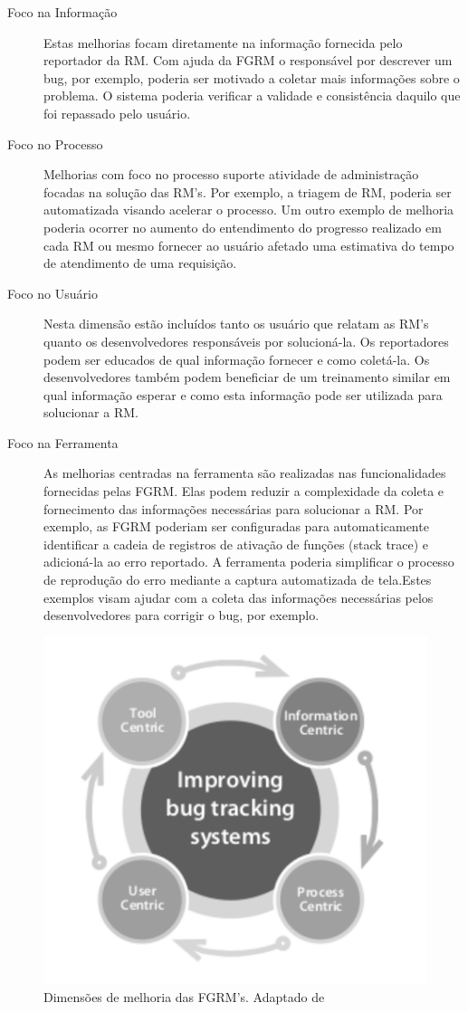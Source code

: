 \begin{description}
	\item[Foco na Informação] Estas melhorias focam diretamente na informação
		fornecida pelo reportador da RM\@. Com ajuda da FGRM o responsável por
		descrever um bug, por exemplo, poderia ser motivado a coletar mais
		informações sobre o problema. O sistema poderia verificar a validade e
		consistência daquilo que foi repassado pelo usuário.
   \item[Foco no Processo] Melhorias com foco no processo suporte atividade de
	   administração focadas na solução das RM's. Por exemplo,
	   a triagem de RM, poderia ser automatizada visando acelerar o processo. Um
	   outro exemplo de melhoria poderia ocorrer no aumento do entendimento do
	   progresso realizado em cada RM ou mesmo fornecer ao usuário afetado uma
	   estimativa do tempo de atendimento de uma requisição.
   \item[Foco no Usuário] Nesta dimensão estão incluídos tanto os usuário que
	   relatam as RM's quanto os desenvolvedores responsáveis por solucioná-la.
	   Os reportadores podem ser educados de qual informação fornecer e como
	   coletá-la. Os desenvolvedores também podem beneficiar de um treinamento
	   similar em qual informação esperar e como esta informação pode ser
	   utilizada para solucionar a RM\@.
	\item[Foco na Ferramenta] As melhorias centradas na ferramenta são
		realizadas nas funcionalidades fornecidas pelas FGRM\@. Elas podem
		reduzir a complexidade da coleta e fornecimento das informações
		necessárias para solucionar a RM\@. Por exemplo, as FGRM poderiam ser
		configuradas para automaticamente identificar a cadeia de registros de
		ativação de funções (stack trace) e adicioná-la ao erro reportado. A
		ferramenta poderia simplificar o processo de reprodução do erro mediante
		a captura automatizada de tela.Estes exemplos visam
		ajudar com a coleta das informações necessárias pelos desenvolvedores
		para corrigir o bug, por exemplo.
\end{description}

\begin{figure}[htpb] \centering
	\includegraphics[width=0.666666\linewidth]
	{chapter-intro/img/dimensoes_melhorias_fgrm.pdf}
	\caption{Dimensões de melhoria das FGRM's. Adaptado
		de~\cite{zimmermann2005mining}}\label{fig:dimensoes_melhorias_fgrm}
\end{figure}


